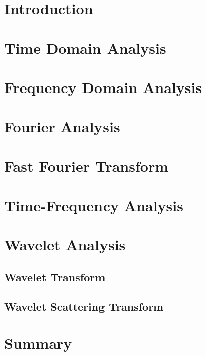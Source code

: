 \section*{Introduction}

\section{Time Domain Analysis}

\section{Frequency Domain Analysis}

\section{Fourier Analysis}

\section{Fast Fourier Transform}

\section{Time-Frequency Analysis}

\section{Wavelet Analysis}

\subsection{Wavelet Transform}

\subsection{Wavelet Scattering Transform}

\section*{Summary}